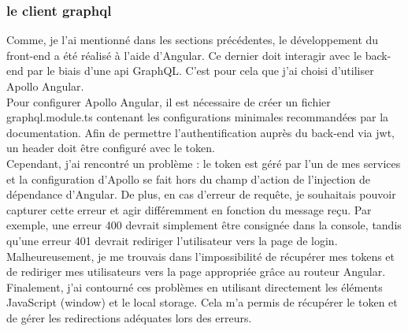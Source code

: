 \subsubsection{le client \Gls{graphql}}

Comme, je l'ai mentionné dans les sections précédentes, le développement du front-end a été réalisé à l'aide d'Angular.
Ce dernier doit interagir avec le back-end par le biais d'une \Gls{api} GraphQL. C'est pour cela que j'ai choisi d'utiliser Apollo Angular.\\

Pour configurer Apollo Angular, il est nécessaire de créer un fichier \Gls{graphql}.module.ts contenant les configurations minimales recommandées par la documentation.
Afin de permettre l'authentification auprès du back-end via \Gls{jwt}, un header doit être configuré avec le token.\\

Cependant, j'ai rencontré un problème : le token est géré par l'un de mes services et la configuration d'Apollo se fait hors du champ d'action de l'injection de dépendance d'Angular.
De plus, en cas d'erreur de requête, je souhaitais pouvoir capturer cette erreur et agir différemment en fonction du message reçu.
Par exemple, une erreur 400 devrait simplement être consignée dans la console, tandis qu'une erreur 401 devrait rediriger l'utilisateur vers la page de login.\\

Malheureusement, je me trouvais dans l'impossibilité de récupérer mes tokens et de rediriger mes utilisateurs vers la page appropriée grâce au routeur Angular.\\

Finalement, j'ai contourné ces problèmes en utilisant directement les éléments JavaScript (window) et le local storage.
Cela m'a permis de récupérer le token et de gérer les redirections adéquates lors des erreurs.
